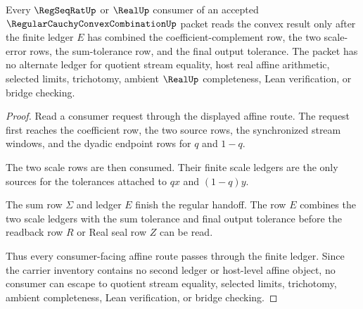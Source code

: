 \begin{theorem}
\label{thm:regular-cauchy-convex-combination-ledger-nonescape}
Every $\RegSeqRatUp$ or $\RealUp$ consumer of an accepted $\RegularCauchyConvexCombinationUp$ packet reads the convex result only after the finite ledger $E$ has combined the coefficient-complement row, the two scale-error rows, the sum-tolerance row, and the final output tolerance. The packet has no alternate ledger for quotient stream equality, host real affine arithmetic, selected limits, trichotomy, ambient $\RealUp$ completeness, Lean verification, or bridge checking.
\end{theorem}
\begin{proof}
Read a consumer request through the displayed affine route. The request first reaches the coefficient row, the two source rows, the synchronized stream windows, and the dyadic endpoint rows for $q$ and $1-q$.

The two scale rows are then consumed. Their finite scale ledgers are the only sources for the tolerances attached to $q x$ and $(1-q)y$.

The sum row $\Sigma$ and ledger $E$ finish the regular handoff. The row $E$ combines the two scale ledgers with the sum tolerance and final output tolerance before the readback row $R$ or Real seal row $Z$ can be read.

Thus every consumer-facing affine route passes through the finite ledger. Since the carrier inventory contains no second ledger or host-level affine object, no consumer can escape to quotient stream equality, selected limits, trichotomy, ambient completeness, Lean verification, or bridge checking.
\end{proof}

\begin{closurestatus}{\RegularCauchyConvexCombinationUp}
  \theoryclosure{\seedClosure}
  \formalstatus{\unformalizedV}
\end{closurestatus}
